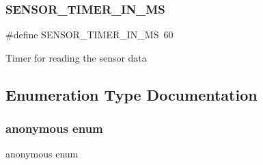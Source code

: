 \subsubsection{\texorpdfstring{S\+E\+N\+S\+O\+R\+\_\+\+T\+I\+M\+E\+R\+\_\+\+I\+N\+\_\+\+MS}{SENSOR\_TIMER\_IN\_MS}}
{\footnotesize\ttfamily \#define S\+E\+N\+S\+O\+R\+\_\+\+T\+I\+M\+E\+R\+\_\+\+I\+N\+\_\+\+MS~60}

Timer for reading the sensor data 

\subsection{Enumeration Type Documentation}
\mbox{\label{group___base_sensors_module_gadf764cbdea00d65edcd07bb9953ad2b7}} 
\subsubsection{\texorpdfstring{anonymous enum}{anonymous enum}}
{\footnotesize\ttfamily anonymous enum}

